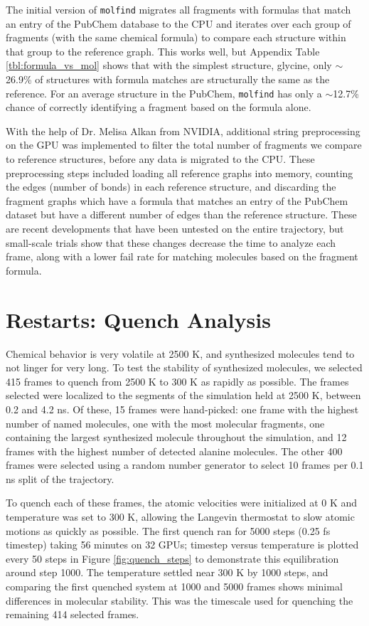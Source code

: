 The initial version of \verb|molfind| migrates all fragments with formulas that match an entry of the PubChem database to the CPU and iterates over each group of fragments (with the same chemical formula) to compare each structure within that group to the reference graph.
This works well, but Appendix Table \ref{tbl:formula_vs_mol} shows that with the simplest structure, glycine, only $\sim$26.9\% of structures with formula matches are structurally the same as the reference.
For an average structure in the PubChem, \verb|molfind| has only a $\sim$12.7\% chance of correctly identifying a fragment based on the formula alone.

With the help of Dr. Melisa Alkan from NVIDIA, additional string preprocessing on the GPU was implemented to filter the total number of fragments we compare to reference structures, before any data is migrated to the CPU.
These preprocessing steps included loading all reference graphs into memory, counting the edges (number of bonds) in each reference structure, and discarding the fragment graphs which have a formula that matches an entry of the PubChem dataset but have a different number of edges than the reference structure.
These are recent developments that have been untested on the entire trajectory, but small-scale trials show that these changes decrease the time to analyze each frame, along with a lower fail rate for matching molecules based on the fragment formula.


\section{Restarts: Quench Analysis}
\label{sec:restarts_quench_analysis}

Chemical behavior is very volatile at 2500 K, and synthesized molecules tend to not linger for very long.
To test the stability of synthesized molecules, we selected 415 frames to quench from 2500 K to 300 K as rapidly as possible.
The frames selected were localized to the segments of the simulation held at 2500 K, between 0.2 and 4.2 ns.
Of these, 15 frames were hand-picked: one frame with the highest number of named molecules, one with the most molecular fragments, one containing the largest synthesized molecule throughout the simulation, and 12 frames with the highest number of detected alanine molecules.
The other 400 frames were selected using a random number generator to select 10 frames per 0.1 ns split of the trajectory.

To quench each of these frames, the atomic velocities were initialized at 0 K and temperature was set to 300 K, allowing the Langevin thermostat to slow atomic motions as quickly as possible.
The first quench ran for 5000 steps (0.25 fs timestep) taking 56 minutes on 32 GPUs; timestep versus temperature is plotted every 50 steps in Figure \ref{fig:quench_steps} to demonstrate this equilibration around step 1000.
The temperature settled near 300 K by 1000 steps, and comparing the first quenched system at 1000 and 5000 frames shows minimal differences in molecular stability.
This was the timescale used for quenching the remaining 414 selected frames.


